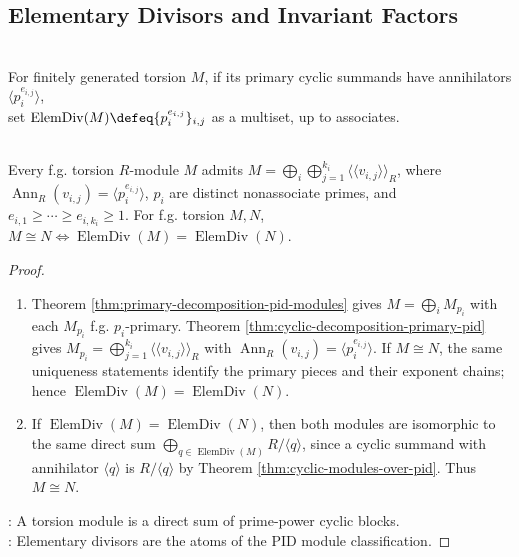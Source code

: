 \subsection{Elementary Divisors and Invariant Factors}

\begin{definition} \label{def:elementary-divisors-pid-module} \\
For finitely generated torsion $M$, if its primary cyclic summands have annihilators
$\langle p_i^{e_{i,j}}\rangle$,\\
set $\operatorname{ElemDiv}(M)\defeq\{p_i^{e_{i,j}}\}_{i,j}$ as a multiset, up to associates.
\end{definition}

\begin{theorem} \label{thm:primary-cyclic-decomposition-pid} \\
Every f.g. torsion $R$-module $M$ admits $M=\bigoplus\limits_i\bigoplus\limits_{j=1}^{k_i}\langle\!\langle v_{i,j}\rangle\!\rangle_R$, where $\operatorname{Ann}_R(v_{i,j})=\langle p_i^{e_{i,j}}\rangle$, $p_i$ are distinct nonassociate primes, and $e_{i,1}\geq\cdots\geq e_{i,k_i}\geq1$. For f.g. torsion $M,N$, $M\cong N\iff\operatorname{ElemDiv}(M)=\operatorname{ElemDiv}(N)$.
\begin{proof}
\begin{enumerate}[label=\roman*.]
\setlength{\itemsep}{0pt}
\item[$(\Rightarrow)$] Theorem \ref{thm:primary-decomposition-pid-modules} gives $M=\bigoplus\limits_iM_{p_i}$ with each $M_{p_i}$ f.g. $p_i$-primary. Theorem \ref{thm:cyclic-decomposition-primary-pid} gives $M_{p_i}=\bigoplus\limits_{j=1}^{k_i}\langle\!\langle v_{i,j}\rangle\!\rangle_R$ with $\operatorname{Ann}_R(v_{i,j})=\langle p_i^{e_{i,j}}\rangle$. If $M\cong N$, the same uniqueness statements identify the primary pieces and their exponent chains; hence $\operatorname{ElemDiv}(M)=\operatorname{ElemDiv}(N)$.
\item[$(\Leftarrow)$] If $\operatorname{ElemDiv}(M)=\operatorname{ElemDiv}(N)$, then both modules are isomorphic to the same direct sum $\bigoplus\limits_{q\in\operatorname{ElemDiv}(M)}R/\langle q\rangle$, since a cyclic summand with annihilator $\langle q\rangle$ is $R/\langle q\rangle$ by Theorem
\ref{thm:cyclic-modules-over-pid}. Thus $M\cong N$.
\end{enumerate}
\noindent
{}: A torsion module is a direct sum of prime-power cyclic blocks.\\
: Elementary divisors are the atoms of the PID module classification.
\end{proof}
\end{theorem}

